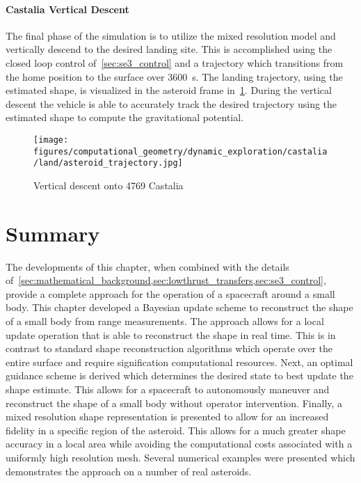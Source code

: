 \documentclass[letterpaper, paper,11pt]{AAS}		%
\begin{document}
\paragraph{Castalia Vertical Descent}

The final phase of the simulation is to utilize the mixed resolution model and vertically descend to the desired landing site. 
This is accomplished using the closed loop control of~\cref{sec:se3_control} and a trajectory which transitions from the home position to the surface over \SI{3600}{\second}.
The landing trajectory, using the estimated shape, is visualized in the asteroid frame in~\cref{fig:castalia_landing}.
During the vertical descent the vehicle is able to accurately track the desired trajectory using the estimated shape to compute the gravitational potential.
\begin{figure}[htbp]
    \centering
    \texttt{[image: figures/computational\_geometry/dynamic\_exploration/castalia/land/asteroid\_trajectory.jpg]}
    \caption{Vertical descent onto 4769 Castalia~\label{fig:castalia_landing}}
\end{figure}

\section{Summary}

The developments of this chapter, when combined with the details of~\cref{sec:mathematical_background,sec:lowthrust_transfers,sec:se3_control}, provide a complete approach for the operation of a spacecraft around a small body.
This chapter developed a Bayesian update scheme to reconstruct the shape of a small body from range measurements. 
The approach allows for a local update operation that is able to reconstruct the shape in real time. 
This is in contrast to standard shape reconstruction algorithms which operate over the entire surface and require signification computational resources.
Next, an optimal guidance scheme is derived which determines the desired state to best update the shape estimate. 
This allows for a spacecraft to autonomously maneuver and reconstruct the shape of a small body without operator intervention.
Finally, a mixed resolution shape representation is presented to allow for an increased fidelity in a specific region of the asteroid.
This allows for a much greater shape accuracy in a local area while avoiding the computational costs associated with a uniformly high resolution mesh.
Several numerical examples were presented which demonstrates the approach on a number of real asteroids.

 

\end{document}
